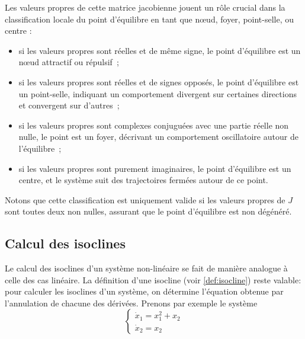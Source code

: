         Les valeurs propres de cette matrice jacobienne jouent un rôle crucial dans la classification locale du point d'équilibre en tant que nœud, foyer, point-selle, ou centre :
        \begin{itemize}
            \item si les valeurs propres sont réelles et de même signe, le point d'équilibre est un nœud attractif ou répulsif~;
            \item si les valeurs propres sont réelles et de signes opposés, le point d'équilibre est un point-selle, indiquant un comportement divergent sur certaines directions et convergent sur d'autres~;
            \item si les valeurs propres sont complexes conjuguées avec une partie réelle non nulle, le point est un foyer, décrivant un comportement oscillatoire autour de l'équilibre~;
            \item si les valeurs propres sont purement imaginaires, le point d'équilibre est un centre, et le système suit des trajectoires fermées autour de ce point.
        \end{itemize}
        Notons que cette classification est uniquement valide si les valeurs propres de $J$ sont toutes deux non nulles, assurant que le point d'équilibre est non dégénéré.

        \subsection{Calcul des isoclines}
            Le calcul des isoclines d'un système non-linéaire se fait de manière analogue à celle des cas linéaire. La définition d'une isocline (voir \ref{def:isocline}) reste valable: pour calculer les isoclines d'un système, on détermine l'équation obtenue par l'annulation de chacune des dérivées. Prenons par exemple le système
            \begin{equation}\label{eq:isocline_non_lineaire}
                \begin{cases}
                    \dot{x}_1 = x_1^2 + x_2 \\
                    \dot{x}_2 = x_2
                \end{cases}
            \end{equation}

